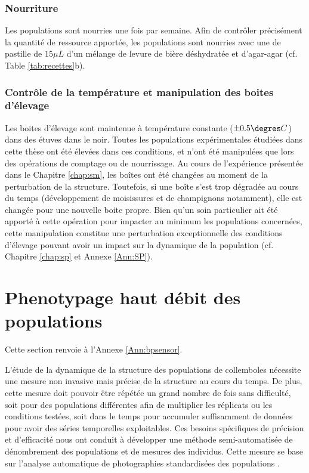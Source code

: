 \subsubsection{Nourriture}

Les populations sont nourries une fois par semaine. Afin de contrôler
précisément la quantité de ressource apportée, les populations sont nourries
avec une de pastille de $15\mu L$ d'un mélange de levure de bière déshydratée et
d'agar-agar (cf. Table \ref{tab:recettes}b).

\subsubsection{Contrôle de la température et manipulation des boites d'élevage}

Les boites d'élevage sont maintenue à température constante ($\pm 0.5\degres C$)
dans des étuves dans le noir. Toutes les populations expérimentales étudiées
dans cette thèse ont été élevées dans ces conditions, et n'ont été manipulées
que lors des opérations de comptage ou de nourrissage. Au cours de l'expérience
présentée dans le Chapitre \ref{chap:sm}, les boîtes ont été changées au
moment de la perturbation de la structure. Toutefois, si une boîte s'est trop
dégradée au cours du temps (développement de moisissures et de
champignons notamment), elle est changée pour une nouvelle boite
propre. Bien qu'un soin particulier ait été apporté à cette opération pour
impacter au minimum les populations concernées, cette manipulation constitue une
 perturbation exceptionnelle des conditions d'élevage pouvant avoir un impact
 sur la dynamique de la population (cf. Chapitre \ref{chap:sp} et Annexe
 \ref{Ann:SP}).

\section{Phenotypage haut débit des populations}
\label{sec:bpsensor}

Cette section renvoie à l'Annexe \ref{Ann:bpsensor}.

L'étude de la dynamique de la structure des populations de collemboles nécessite
une mesure non invasive mais précise de la structure au cours du temps. De plus,
cette mesure doit pouvoir être répétée un grand nombre de fois sans difficulté,
soit pour des populations différentes afin de multiplier les réplicats ou les
conditions testées, soit dans le temps pour accumuler suffisamment de données
pour avoir des séries temporelles exploitables. Ces besoins spécifiques de
précision et d'efficacité nous ont conduit à développer une méthode
semi-automatisée de dénombrement des populations et de mesures des individus.
Cette mesure se base sur l'analyse automatique de photographies standardisées
des populations \autocites[Figure
\ref{fig:photocount}, ][]{mallard2012a,mallard2013a}.


